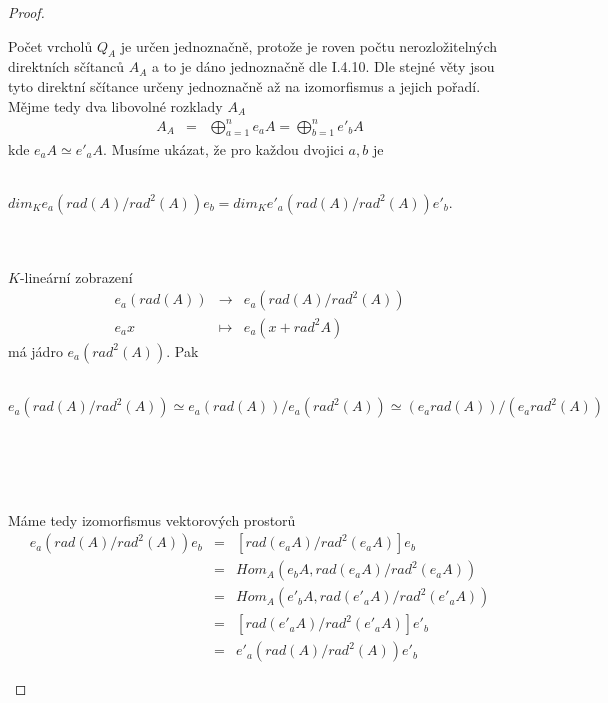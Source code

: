     \begin{proof}
      \begin{description}
        \item
        
        \item[(a)] Počet vrcholů $Q_A$ je určen jednoznačně, protože je roven 
          počtu nerozložitelných direktních sčítanců $A_A$ a to je dáno jednoznačně dle \cite{1} I.4.10.
          Dle stejné věty jsou tyto direktní sčítance určeny jednoznačně až na 
          izomorfismus a jejich pořadí. Mějme tedy dva libovolné rozklady $A_A$ 
          \begin{eqnarray}
            A_A &=& \bigoplus_{a=1}^n e_aA = \bigoplus_{b=1}^n e'_bA \nonumber
          \end{eqnarray}
          kde $e_aA \simeq e'_aA$. Musíme ukázat, že pro každou dvojici $a,b$ 
          je \\\\
          \centerline{$dim_K e_a(rad(A)/rad^2(A))e_b=dim_K e'_a(rad(A)/rad^2(A))e'_b$.} 
          \\\\
          $K$-lineární zobrazení 
          \begin{eqnarray}
            e_a (rad(A)) &\to& e_a (rad(A)/rad^2(A)) \nonumber \\
            e_ax &\mapsto& e_a(x+rad^2A)  \nonumber
          \end{eqnarray}
          má jádro $e_a (rad^2(A))$. Pak \\\\
          \centerline{$e_a (rad(A)/rad^2(A)) \simeq e_a (rad(A))/e_a(rad^2(A)) \simeq (e_a rad(A))/(e_a rad^2(A))$\\\\\\}\\\\
          Máme tedy izomorfismus vektorových prostorů
          \begin{eqnarray}
            e_a (rad(A)/ rad^2(A)) e_b
            &=& [ rad(e_aA)/ rad^2(e_aA)]e_b \nonumber \\
            &=& Hom_A(e_bA,rad(e_aA)/rad^2(e_aA))  \nonumber \\
            &=& Hom_A(e'_bA,rad(e'_aA)/rad^2(e'_aA))  \nonumber \\
            &=& [ rad(e'_aA)/ rad^2(e'_aA)]e'_b  \nonumber \\
            &=& e'_a (rad(A)/ rad^2(A)) e'_b  \nonumber 
          \end{eqnarray}
        

\end{description}
\end{proof}
